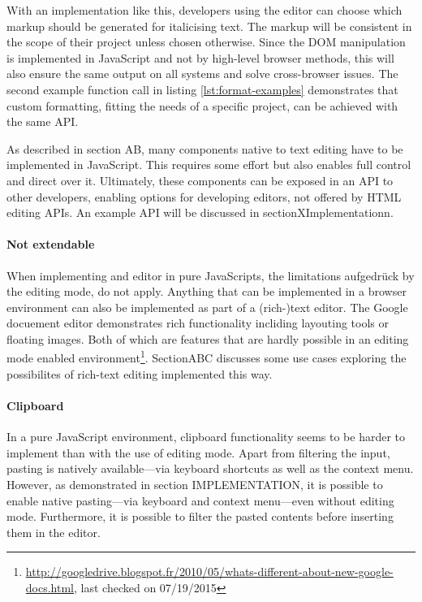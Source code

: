 With an implementation like this, developers using the editor can choose which markup should be generated for italicising text. The markup will be consistent in the scope of their project unless chosen otherwise. Since the DOM manipulation is implemented in JavaScript and not by high-level browser methods, this will also ensure the same output on all systems and solve cross-browser issues. The second example function call in listing \ref{lst:format-examples} demonstrates that custom formatting, fitting the needs of a specific project, can be achieved with the same API.

As described in section AB, many components native to text editing have to be implemented in JavaScript. This requires some effort but also enables full control and direct over it. Ultimately, these components can be exposed in an API to other developers, enabling options for developing editors, not offered by HTML editing APIs. An example API will be discussed in sectionXImplementationn.

\paragraph{Not extendable} When implementing and editor in pure JavaScripts, the limitations aufgedrück by the editing mode, do not apply. Anything that can be implemented in a browser environment can also be implemented as part of a (rich-)text editor. The Google docuement editor demonstrates rich functionality incliding layouting tools or floating images. Both of which are features that are hardly possible in an editing mode enabled environment\footnote{\url{http://googledrive.blogspot.fr/2010/05/whats-different-about-new-google-docs.html}, last checked on 07/19/2015}. SectionABC discusses some use cases exploring the possibilites of rich-text editing implemented this way. %

\paragraph{Clipboard} In a pure JavaScript environment, clipboard functionality seems to be harder to implement than with the use of editing mode. Apart from filtering the input, pasting is natively available---via keyboard shortcuts as well as the context menu. However, as demonstrated in section IMPLEMENTATION, it is possible to enable native pasting---via keyboard and context menu---even without editing mode. Furthermore, it is possible to filter the pasted contents before inserting them in the editor.

